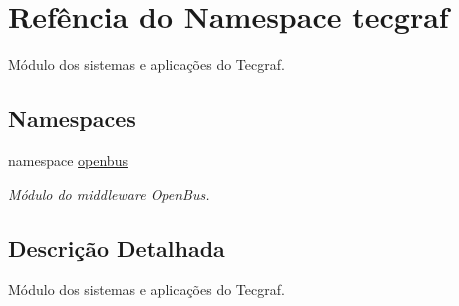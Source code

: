 \hypertarget{namespacetecgraf}{\section{\-Refência do \-Namespace tecgraf}
\label{namespacetecgraf}
}


\-Módulo dos sistemas e aplicações do \-Tecgraf.  


\subsection*{\-Namespaces}
\begin{DoxyCompactItemize}
\item 
namespace \hyperlink{namespacetecgraf_1_1openbus}{openbus}
\begin{DoxyCompactList}\small\item\em \-Módulo do middleware \-Open\-Bus. \end{DoxyCompactList}\end{DoxyCompactItemize}


\subsection{\-Descrição \-Detalhada}
\-Módulo dos sistemas e aplicações do \-Tecgraf. 